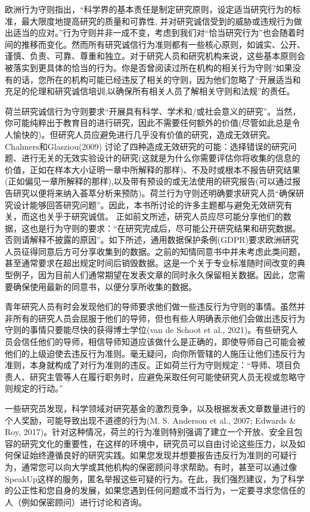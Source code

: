 \documentclass[
  letterpaper,
  DIV=11,
  numbers=noendperiod]{scrreprt}
\begin{document}
欧洲行为守则指出，``科学界的基本责任是制定研究原则，设定适当研究行为的标准，最大限度地提高研究的质量和可靠性,
并对研究诚信受到的威胁或违规行为做出适当的应对。''行为守则并非一成不变，考虑到我们对``恰当研究行为''也会随着时间的推移而变化。然而所有研究诚信行为准则都有一些核心原则，如诚实、公开、谨慎、负责、可靠、尊重和独立。对于研究人员和研究机构来说，这些基本原则会被落实到更具体的恰当的行为。你是否曾阅读过所在机构的相关行为守则?如果没有的话，您所在的机构可能已经违反了相关的守则，因为他们忽略了``开展适当和充足的伦理和研究诚信培训,以确保所有相关人员了解相关守则和法规''的责任。

荷兰研究诚信行为守则要求``开展具有科学、学术和/或社会意义的研究''。当然，你可能纯粹出于教育目的进行研究，因此不需要任何额外的价值(尽管如此总是令人愉快的)。但研究人员应避免进行几乎没有价值的研究，造成无效研究。Chalmers和Glasziou(2009)
讨论了四种造成无效研究的可能：选择错误的研究问题、进行无关的无效实验设计的研究(这就是为什么你需要评估你将收集的信息的价值，正如在样本大小证明一章中所解释的那样)、不及时或根本不报告研究结果(正如偏见一章所解释的那样),以及带有预设的或无法使用的研究报告(可以通过报告研究以便将来纳入荟萃分析来预防)。荷兰行为守则还明确要求研究人员``确保研究设计能够回答研究问题''。因此，本书所讨论的许多主题都与避免无效研究有关，而这也关乎于研究诚信。
正如前文所述，研究人员应尽可能分享他们的数据，这也是行为守则的要求：``在研究完成后，尽可能公开研究结果和研究数据。否则请解释不披露的原因''。如下所述，通用数据保护条例(GDPR)要求欧洲研究人员征得同意后方可分享收集到的数据。之前的知情同意书中并未考虑此类问题，甚至通常要求在超出规定时间后销毁数据。这是一个关于专业标准随时间改变的典型例子，因为目前人们通常期望在发表文章的同时永久保留相关数据。因此，您需要确保使用最新的同意书，以便分享所收集的数据。

青年研究人员有时会发现他们的导师要求他们做一些违反行为守则的事情。虽然并非所有的研究人员会屈服于他们的导师，但也有些人明确表示他们会做出违反行为守则的事情只要能尽快的获得博士学位(van
de Schoot et al.,
2021)。有些研究人员会信任他们的导师，相信导师知道应该做什么是正确的，即使导师自己可能会被他们的上级迫使去违反行为准则。毫无疑问，向你所管辖的人施压让他们违反行为准则，本身就构成了对行为准则的违反。正如荷兰行为守则规定：``导师、项目负责人、研究主管等人在履行职务时，应避免采取任何可能使研究人员无视或忽略守则规定的行动。''

一些研究员发现，科学领域对研究基金的激烈竞争，以及根据发表文章数量进行的个人奖励，可能导致出现不道德的行为(M.
S. Anderson et al., 2007; Edwards \& Roy,
2017)。针对这种情况，荷兰的行为准则特别强调了建立一个开放、安全且包容的研究文化的重要性，在这样的环境中，研究员可以自由讨论这些压力，以及如何保证始终遵循良好的研究实践。如果您发现并想要报告违反行为准则的可疑行为，通常您可以向大学或其他机构的保密顾问寻求帮助。有时，甚至可以通过像SpeakUp这样的服务，匿名举报这些可疑的行为。在此，我们强烈建议，为了科学的公正性和您自身的发展，如果您遇到任何问题或不当行为，一定要寻求您信任的人（例如保密顾问）进行讨论和咨询。
\end{document}
